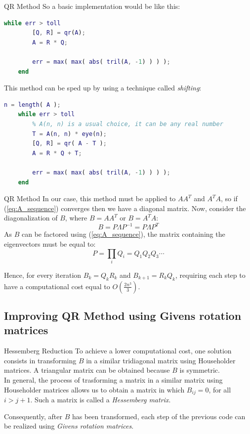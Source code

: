 \documentclass[10pt]{beamer}
\begin{document}
\begin{frame}[fragile]{QR Method}
    So a basic implementation would be like this:
    \begin{lstlisting}[language=Matlab]
    while err > toll
        [Q, R] = qr(A);
        A = R * Q;

        err = max( max( abs( tril(A, -1) ) ) );
    end \end{lstlisting}
    This method can be sped up by using a technique called \textit{shifting}:
    \begin{lstlisting}[language=Matlab]
    n = length( A );
    while err > toll
        % A(n, n) is a usual choice, it can be any real number
        T = A(n, n) * eye(n);
        [Q, R] = qr( A - T );
        A = R * Q + T;

        err = max( max( abs( tril(A, -1) ) ) );
    end \end{lstlisting}
\end{frame}

\begin{frame}{QR Method}
    In our case, this method must be applied to $A A^T$ and $A^T A$, so if (\ref{eq:A_sequence}) converges then we have a diagonal matrix. \newline
    Now, consider the diagonalization of $B$, where $B = A A^T$ or $B = A^T A$:
    $$
    B = P \Lambda P^{-1} =  P \Lambda P^T
    $$
    As $B$ can be factored using (\ref{eq:A_sequence}), the matrix containing the eigenvectors must be equal to:
    $$
    P = \prod_i Q_i = Q_1 Q_2 Q_3 \cdots
    $$ \bigskip

    Hence, for every iteration $B_k = Q_k R_k$ and $B_{k+1} = R_k Q_k$, requiring each step to have a computational cost equal to $O(\frac{2 n^3}{3})$.
\end{frame}

\subsection{Improving QR Method using Givens rotation matrices}

\begin{frame}{Hessemberg Reduction}
    To achieve a lower computational cost, one solution consists in transforming $B$ in a similar tridiagonal matrix using Householder matrices. \newline
    A triangular matrix can be obtained because $B$ is symmetric. \\  \bigskip
    In general, the process of trasforming a matrix in a similar matrix using Householder matrices allows us to obtain a matrix in which $B_{ij} = 0$, for all $i > j + 1$. Such a matrix is called a \textit{Hessemberg matrix}. \bigskip

    Consequently, after $B$ has been transformed, each step of the previous code can be realized using \textit{Givens rotation matrices}.
\end{frame}
\end{document}
